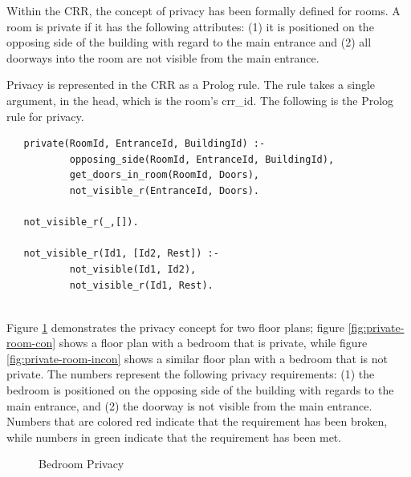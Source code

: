 \documentclass[12pt]{ucthesis}
\begin{document}
Within the CRR, the concept of privacy has been formally defined for rooms. A room is private if it has the following attributes: (1) it is positioned on the opposing side of the building with regard to the main entrance and (2) all doorways into the room are not visible from the main entrance.
 
Privacy is represented in the CRR as a Prolog rule. The rule takes a single argument, in the head, which is the room's crr\_id. The following is the Prolog rule for privacy. 
\begin{verbatim}
   private(RoomId, EntranceId, BuildingId) :-  
           opposing_side(RoomId, EntranceId, BuildingId),
           get_doors_in_room(RoomId, Doors),
           not_visible_r(EntranceId, Doors). 

   not_visible_r(_,[]).
   
   not_visible_r(Id1, [Id2, Rest]) :-
           not_visible(Id1, Id2),
           not_visible_r(Id1, Rest).   
   
\end{verbatim}

Figure \ref{room-privacy} demonstrates the privacy concept for two floor plans; figure \ref{fig:private-room-con} shows a floor plan with a bedroom that is  private, while figure \ref{fig:private-room-incon} shows a similar floor plan with a bedroom that is not private. The numbers represent the following privacy requirements: (1) the bedroom is positioned on the opposing side of the building with regards to the main entrance, and (2) the doorway is not visible from the main entrance. Numbers that are colored red indicate that the requirement has been broken, while numbers in green indicate that the requirement has been met.

\begin{figure}[H]
 \centering
  \hspace{5mm}
 \caption{Bedroom Privacy}
\label{room-privacy}
\end{figure}
\end{document}
